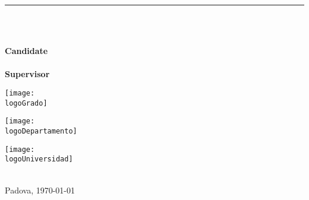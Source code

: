 

\begin{titlepage}

	
	\setlength{\centeroffset}{-0.5\oddsidemargin}
	\addtolength{\centeroffset}{0.5\evensidemargin}
	\thispagestyle{empty}
	
	\noindent\hspace*{\centeroffset}\begin{minipage}{\textwidth}
	\centering
	\begin{spacing}{1.5}{\huge\bfseries \titulo}\end{spacing}
		\noindent\rule[-1ex]{\textwidth}{3pt}\\[3.5ex] %
		{\large\bfseries \subtitulo\\[4cm]}
	\end{minipage}
	
	\vspace{2.5cm}
	
	\noindent\hspace*{\centeroffset}
	\begin{minipage}{\textwidth}
		\centering
		
		\textbf{Candidate}\\ {\miNombre}\\[2.5ex]
		\textbf{Supervisor}\\
		{\normalsize \miTutor}
	\end{minipage}
	
	\vspace*{\fill}
	
	\noindent\hspace*{\centeroffset}
	\begin{minipage}{\textwidth}
		\centering
		\noindent\hspace*{\centeroffset}
		\begin{center}
			{\texttt{[image: \\logoGrado]}}\\
			{\raggedleft\miGrado}
		\end{center}
		\vspace*{2em}
		\centering
		\noindent\hspace*{\centeroffset}
		\begin{minipage}[l]{6cm}
			\texttt{[image: \\logoDepartamento]}
		\end{minipage}
		\begin{minipage}[r]{6cm}
			\texttt{[image: \\logoUniversidad]}
		\end{minipage}
		\\[1cm]
		Padova, \today
	\end{minipage}



\end{titlepage}
